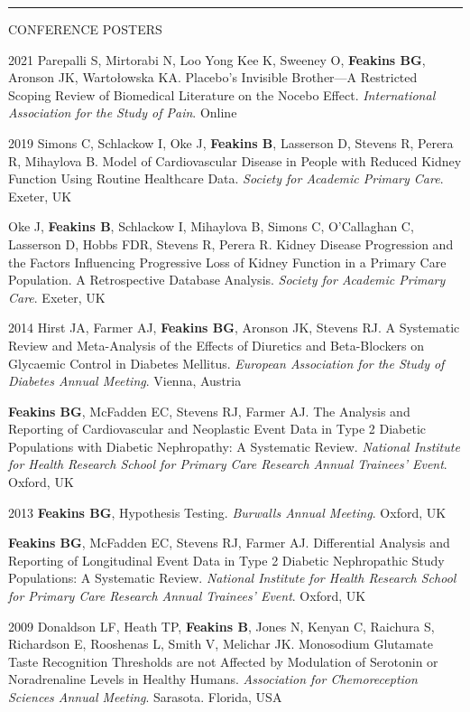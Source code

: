 \documentclass[10pt,a4paper]{article}
\begin{document}
\noindent\rule{\textwidth}{0.4pt}
\begin{cvlist}{CONFERENCE POSTERS}
	
	\item[2021]
	Parepalli S, Mirtorabi N, Loo Yong Kee K, Sweeney O, \textbf{Feakins BG}, Aronson JK, Warto\l{}owska KA. Placebo's Invisible Brother---A Restricted Scoping Review of Biomedical Literature on the Nocebo Effect. \textit{International Association for the Study of Pain}. Online
	
	\item[2019]
	Simons C, Schlackow I, Oke J, \textbf{Feakins B}, Lasserson D, Stevens R, Perera R, Mihaylova B. Model of Cardiovascular Disease in People with Reduced Kidney Function Using Routine Healthcare Data. \textit{Society for Academic Primary Care}. Exeter, UK
	
	\item[]
	Oke J, \textbf{Feakins B}, Schlackow I, Mihaylova B, Simons C, O’Callaghan C, Lasserson D, Hobbs FDR, Stevens R, Perera R. Kidney Disease Progression and the Factors Influencing Progressive Loss of Kidney Function in a Primary Care Population. A Retrospective Database Analysis. \textit{Society for Academic Primary Care}. Exeter, UK
	
	\item[2014]
	Hirst JA, Farmer AJ, \textbf{Feakins BG}, Aronson JK, Stevens RJ. A Systematic Review and Meta-Analysis of the Effects of Diuretics and Beta-Blockers on Glycaemic Control in Diabetes Mellitus. \textit{European Association for the Study of Diabetes Annual Meeting}. Vienna, Austria
	
	\item[]
	\textbf{Feakins BG}, McFadden EC, Stevens RJ, Farmer AJ. The Analysis and Reporting of Cardiovascular and Neoplastic Event Data in Type 2 Diabetic Populations with Diabetic Nephropathy: A Systematic Review. \textit{National Institute for Health Research School for Primary Care Research Annual Trainees' Event}. Oxford, UK
	
	\item[2013]
	\textbf{Feakins BG}, Hypothesis Testing. \textit{Burwalls Annual Meeting}. Oxford, UK
	
	\item[]
	\textbf{Feakins BG}, McFadden EC, Stevens RJ, Farmer AJ. Differential Analysis and Reporting of Longitudinal Event Data in Type 2 Diabetic Nephropathic Study Populations: A Systematic Review. \textit{National Institute for Health Research School for Primary Care Research Annual Trainees' Event}. Oxford, UK
	
	\item[2009]
	Donaldson LF, Heath TP, \textbf{Feakins B}, Jones N, Kenyan C, Raichura S, Richardson E, Rooshenas L, Smith V, Melichar JK. Monosodium Glutamate Taste Recognition Thresholds are not Affected by Modulation of Serotonin or Noradrenaline Levels in Healthy Humans. \textit{Association for Chemoreception Sciences Annual Meeting}. Sarasota. Florida, USA
	
\end{cvlist}
\end{document}
